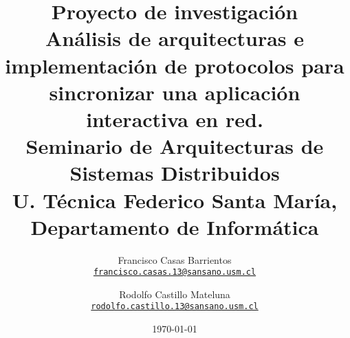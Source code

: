 \documentclass[twoside,twocolumn,letterpaper,11pt]{article}
\title{\Large Proyecto de investigación\\
\huge Análisis de arquitecturas e implementación de protocolos para sincronizar una aplicación interactiva en red.
\\ \Large Seminario de Arquitecturas de Sistemas Distribuidos\\
\small U. Técnica Federico Santa María, Departamento de Informática}
\author{Francisco Casas Barrientos\\
       \texttt{\small\href{mailto:francisco.casas.13@sansano.usm.cl}{francisco.casas.13@sansano.usm.cl}}
\and
Rodolfo Castillo Mateluna\\
       \small\texttt{\href{mailto:rodolfo.castillo.13@sansano.usm.cl}{rodolfo.castillo.13@sansano.usm.cl}}
\\
}
\date{\today} %
\begin{document}
\maketitle




















{}
\end{document}
